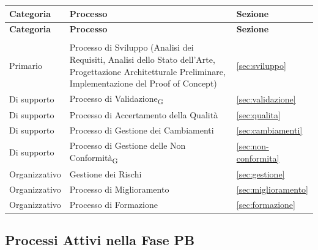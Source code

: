 \begin{xltabular}{\textwidth}{
    >{\raggedright\arraybackslash}p{3cm}
    >{\raggedright\arraybackslash}X
    >{\raggedright\arraybackslash}p{3cm}
}
    \toprule
    \textbf{Categoria} & \textbf{Processo} & \textbf{Sezione} \\
    \midrule
    \endfirsthead

    \toprule
    \textbf{Categoria} & \textbf{Processo} & \textbf{Sezione} \\
    \midrule
    \endhead

    \midrule
     \\
    \endfoot

    \bottomrule
    \endlastfoot

    Primario
    & Processo di Sviluppo (Analisi dei Requisiti, Analisi dello Stato dell'Arte, Progettazione Architetturale Preliminare, Implementazione del Proof of Concept)
    & \ref{sec:sviluppo} \\

    Di supporto
    & Processo di Validazione\textsubscript{G}
    & \ref{sec:validazione} \\

    Di supporto
    & Processo di Accertamento della Qualità
    & \ref{sec:qualita} \\

    Di supporto
    & Processo di Gestione dei Cambiamenti
    & \ref{sec:cambiamenti} \\

    Di supporto
    & Processo di Gestione delle Non Conformità\textsubscript{G}
    & \ref{sec:non-conformita} \\

    Organizzativo
    & Gestione dei Rischi
    & \ref{sec:gestione} \\

    Organizzativo
    & Processo di Miglioramento
    & \ref{sec:miglioramento} \\

    Organizzativo
    & Processo di Formazione
    & \ref{sec:formazione} \\

\end{xltabular}


\subsection{Processi Attivi nella Fase PB}

